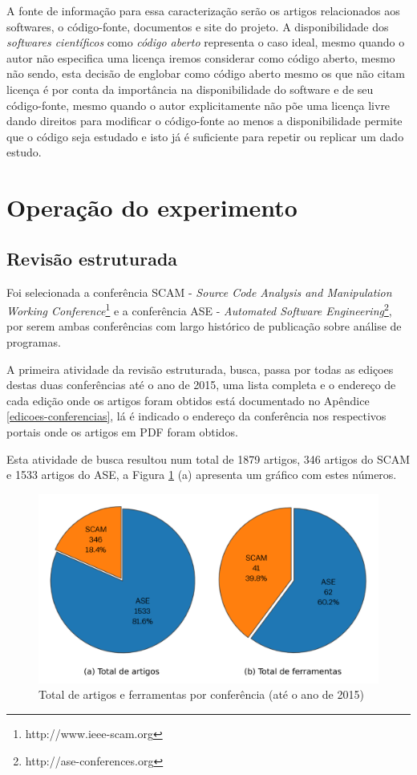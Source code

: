 A fonte de informação para essa caracterização serão os artigos relacionados
aos softwares, o código-fonte, documentos e site do projeto. A disponibilidade
dos {\it softwares científicos} como {\it código aberto} representa o caso
ideal, mesmo quando o autor não especifica uma licença iremos considerar como
código aberto, mesmo não sendo, esta decisão de englobar como código aberto
mesmo os que não citam licença é por conta da importância na disponibilidade do
software e de seu código-fonte, mesmo quando o autor explicitamente não põe uma
licença livre dando direitos para modificar o código-fonte ao menos a
disponibilidade permite que o código seja estudado e isto já é suficiente para
repetir ou replicar um dado estudo.

\section{Operação do experimento}

\subsection{Revisão estruturada}

Foi selecionada a conferência SCAM - {\it Source Code Analysis and Manipulation Working
Conference}\footnote{http://www.ieee-scam.org} e a conferência ASE - {\it Automated
Software Engineering}\footnote{http://ase-conferences.org}, por serem ambas
conferências com largo histórico de publicação sobre análise de programas.

A primeira atividade da revisão estruturada, busca, passa por todas as ediçoes
destas duas conferências até o ano de 2015, uma lista completa e o endereço de
cada edição onde os artigos foram obtidos está documentado no Apêndice
\ref{edicoes-conferencias}, lá é indicado o endereço da conferência nos
respectivos portais onde os artigos em PDF foram obtidos.

Esta atividade de busca resultou num total de 1879 artigos, 346 artigos do SCAM
e 1533 artigos do ASE, a Figura \ref{grafico-total-artigos} (a) apresenta um
gráfico com estes números.

\begin{figure}[H]
  \center
  \includegraphics[scale=0.9]{imagens/total-artigos-e-ferramentas.png}
  \caption{Total de artigos e ferramentas por conferência (até o ano de 2015)}
  \label{grafico-total-artigos}
\end{figure}

